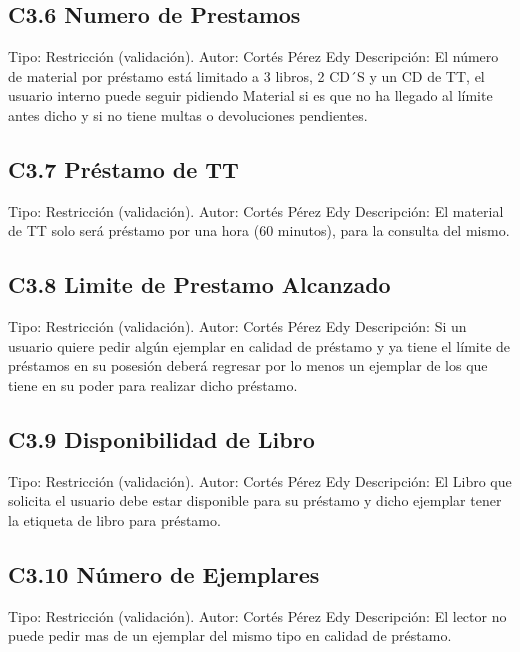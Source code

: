 \subsection{C3.6 Numero de Prestamos}
	\UCli Tipo: Restricción (validación).
	\UCli Autor: Cortés Pérez Edy
	\UCli Descripción: El número de material por préstamo está limitado a 3 libros, 2 CD´S y un CD de TT, el usuario interno puede seguir pidiendo Material si es que no ha llegado al límite antes dicho y si no tiene multas o devoluciones pendientes.
	
\subsection{C3.7 Préstamo de TT}
	\UCli Tipo: Restricción (validación).
	\UCli Autor: Cortés Pérez Edy
	\UCli Descripción: El material de TT solo será préstamo por una hora (60 minutos), para la consulta del mismo.

\subsection{C3.8 Limite de Prestamo Alcanzado}
	\UCli Tipo: Restricción (validación).
	\UCli Autor: Cortés Pérez Edy
	\UCli Descripción: Si un usuario quiere pedir algún ejemplar en calidad de préstamo y ya tiene el límite de préstamos en su posesión deberá regresar por lo menos un ejemplar de los que tiene en su poder para realizar dicho préstamo.

\subsection{C3.9 Disponibilidad de Libro}
	\UCli Tipo: Restricción (validación).
	\UCli Autor: Cortés Pérez Edy
	\UCli Descripción: El Libro que solicita el usuario debe estar disponible para su préstamo y dicho ejemplar tener la etiqueta de libro para préstamo.
	
\subsection{C3.10 Número de Ejemplares}
	\UCli Tipo: Restricción (validación).
	\UCli Autor: Cortés Pérez Edy
	\UCli Descripción: El lector no puede pedir mas de un ejemplar del mismo tipo en calidad de préstamo.
	
